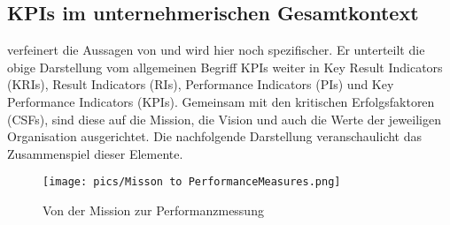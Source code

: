 \subsection{KPIs im unternehmerischen Gesamtkontext}
\label{parmenter}
\cite{parmenter_key_2010} verfeinert die Aussagen von \cite{hes_use_2022} und wird hier noch spezifischer. Er unterteilt die obige Darstellung vom allgemeinen Begriff KPIs weiter in  Key Result Indicators (KRIs), Result Indicators (RIs), Performance Indicators (PIs) und Key Performance Indicators (KPIs). Gemeinsam mit den kritischen Erfolgsfaktoren (CSFs), sind diese auf die Mission, die Vision und auch die Werte der jeweiligen Organisation ausgerichtet. Die nachfolgende Darstellung veranschaulicht das Zusammenspiel dieser Elemente.


\begin{figure}[h]
\centering
\texttt{[image: pics/Misson to PerformanceMeasures.png]}
\caption{Von der Mission zur Performanzmessung} \citep[S.35]{parmenter_key_2010}
\label{fig:mission}
\end{figure}

\FloatBarrier

